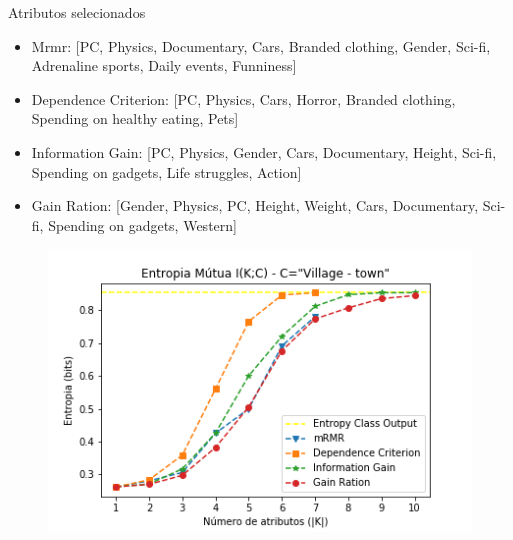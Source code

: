 \documentclass{beamer}
\begin{document}
\begin{frame}{Atributos selecionados}
	\begin{itemize}
		\item Mrmr: [PC, Physics, Documentary, Cars, Branded clothing, Gender, Sci-fi, Adrenaline sports, Daily events, Funniness] 
\item Dependence Criterion: [PC, Physics, Cars, Horror, Branded clothing, Spending on healthy eating, Pets] 
\item Information Gain: [PC, Physics, Gender, Cars, Documentary, Height, Sci-fi, Spending on gadgets, Life struggles, Action] 
\item Gain Ration: [Gender, Physics, PC, Height, Weight, Cars, Documentary, Sci-fi, Spending on gadgets, Western] 
	\end{itemize}
\end{frame}

\begin{frame}
	\begin{figure}[ht]
		\begin{center}
 	 	  \includegraphics[scale=0.7]{figuras/Entropy_Village-town.png}	
		  \label{fig:fluxogramaAG}		
		\end{center}
	\end{figure}
\end{frame}
\end{document}
